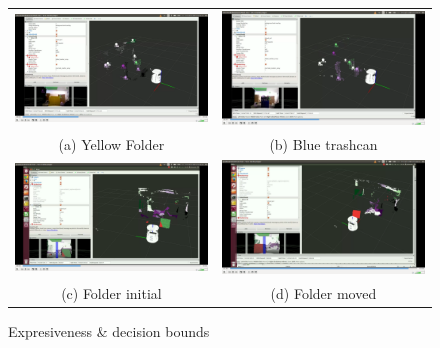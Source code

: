 \documentclass[]{article}
\begin{document}
    \begin{figure}
        \begin{tabular}{cc}
            \includegraphics[width=.3\textwidth]{colorBound} &   \includegraphics[width=.3\textwidth]{colorBound2} \\
            (a) Yellow Folder& (b) Blue trashcan \\[6pt]
            \includegraphics[width=.3\textwidth]{posBound} &   \includegraphics[width=.3\textwidth]{posBound2} \\
            (c) Folder initial  & (d) Folder moved \\[6pt]
        \end{tabular}
        \caption{Expresiveness \& decision bounds}
        \label{pip:bounds}
    \end{figure}
\end{document}
